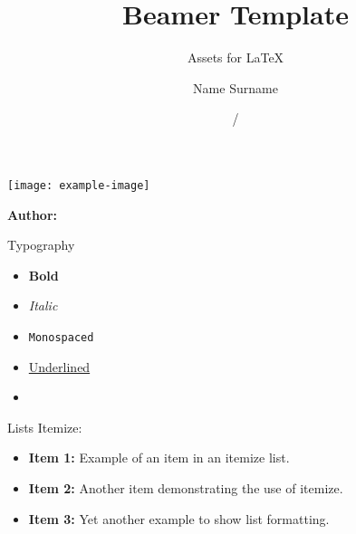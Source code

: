 \documentclass[12pt]{beamer}
\title[Insitute]{Beamer Template}
\subtitle{Assets for \LaTeX}
\author[Name Surname]{Name Surname}
\institute[]{Insitute}
\date{\currentyear/\nextyear} %
\begin{document}
\begin{frame}{}
\vspace{\fill}

\texttt{[image: example-image]}

\vspace{\fill}

\Large
\color{main}
\inserttitle

\medskip

\large
\color{black}
\insertsubtitle

\vspace{\fill}

\footnotesize
\insertinstitute

\vspace{\fill}

\textbf{Author:} \insertauthor

\medskip

\insertdate

\vspace{\fill}
\end{frame}

\begin{frame}[allowframebreaks]{Typography}
\begin{itemize}
    \item \textbf{Bold}
    \item \textit{Italic}
    \item \texttt{Monospaced}
    \item \underline{Underlined}
    \item \href{https://example.com/}{\underline{\color{main}{Link}}}
\end{itemize}
\end{frame}

\begin{frame}[allowframebreaks]{Lists}
Itemize:

\begin{itemize}
    \item \textbf{Item 1:} Example of an item in an itemize list.
    \item \textbf{Item 2:} Another item demonstrating the use of itemize.
    \item \textbf{Item 3:} Yet another example to show list formatting.
\end{itemize}
\end{frame}
\end{document}
